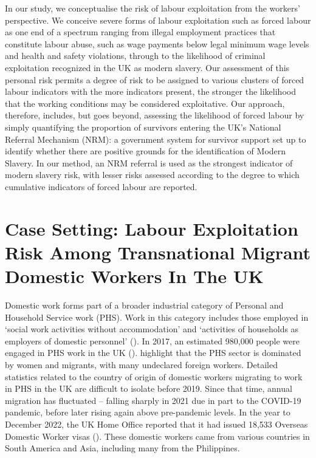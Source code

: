 \documentclass[
  12pt,
  letterpaper,
  DIV=11,
  numbers=noendperiod]{scrartcl}
\begin{document}
In our study, we conceptualise the risk of labour exploitation from the
workers' perspective. We conceive severe forms of labour exploitation
such as forced labour as one end of a spectrum ranging from illegal
employment practices that constitute labour abuse, such as wage payments
below legal minimum wage levels and health and safety violations,
through to the likelihood of criminal exploitation recognized in the UK
as modern slavery. Our assessment of this personal risk permits a degree
of risk to be assigned to various clusters of forced labour indicators
with the more indicators present, the stronger the likelihood that the
working conditions may be considered exploitative. Our approach,
therefore, includes, but goes beyond, assessing the likelihood of forced
labour by simply quantifying the proportion of survivors entering the
UK's National Referral Mechanism (NRM): a government system for survivor
support set up to identify whether there are positive grounds for the
identification of Modern Slavery. In our method, an NRM referral is used
as the strongest indicator of modern slavery risk, with lesser risks
assessed according to the degree to which cumulative indicators of
forced labour are reported.

\section{Case Setting: Labour Exploitation Risk Among Transnational
Migrant Domestic Workers In The
UK}\label{case-setting-labour-exploitation-risk-among-transnational-migrant-domestic-workers-in-the-uk}

Domestic work forms part of a broader industrial category of Personal
and Household Service work (PHS). Work in this category includes those
employed in `social work activities without accommodation' and
`activities of households as employers of domestic personnel'
(\textcite{european_commission_staff_2012}). In 2017, an estimated
980,000 people were engaged in PHS work in the UK
(\textcite{manoudi_analysis_2018}). \textcite{manoudi_analysis_2018}
highlight that the PHS sector is dominated by women and migrants, with
many undeclared foreign workers. Detailed statistics related to the
country of origin of domestic workers migrating to work in PHS in the UK
are difficult to isolate before 2019. Since that time, annual migration
has fluctuated -- falling sharply in 2021 due in part to the COVID-19
pandemic, before later rising again above pre-pandemic levels. In the
year to December 2022, the UK Home Office reported that it had issued
18,533 Overseas Domestic Worker visas (\textcite{home_office_why_2023}).
These domestic workers came from various countries in South America and
Asia, including many from the Philippines.
\end{document}
